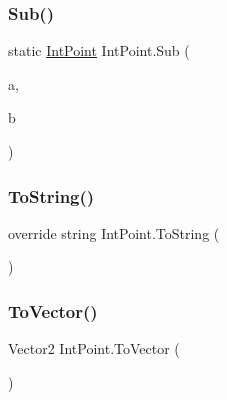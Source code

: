\mbox{\label{struct_int_point_add7064e8013bc061ff7c800362c78634}} 
\subsubsection{\texorpdfstring{Sub()}{Sub()}\hspace{0.1cm}{\footnotesize\ttfamily [2/2]}}
{\footnotesize\ttfamily static \mbox{\hyperlink{struct_int_point}{Int\+Point}} Int\+Point.\+Sub (\begin{DoxyParamCaption}\item[{\mbox{\hyperlink{struct_int_point}{Int\+Point}}}]{a,  }\item[{\mbox{\hyperlink{struct_int_point}{Int\+Point}}}]{b }\end{DoxyParamCaption})\hspace{0.3cm}{\ttfamily [static]}}

\mbox{\label{struct_int_point_a1d4d1b0f6bdabf751d65167bd9c257c8}} 
\subsubsection{\texorpdfstring{To\+String()}{ToString()}}
{\footnotesize\ttfamily override string Int\+Point.\+To\+String (\begin{DoxyParamCaption}{ }\end{DoxyParamCaption})}

\mbox{\label{struct_int_point_a755fe840cba345e23b9adba59c954ee1}} 
\subsubsection{\texorpdfstring{To\+Vector()}{ToVector()}}
{\footnotesize\ttfamily Vector2 Int\+Point.\+To\+Vector (\begin{DoxyParamCaption}{ }\end{DoxyParamCaption})}

\mbox{\label{struct_int_point_ad3c6094ef41ce5eb1717aba101160c94}} 
